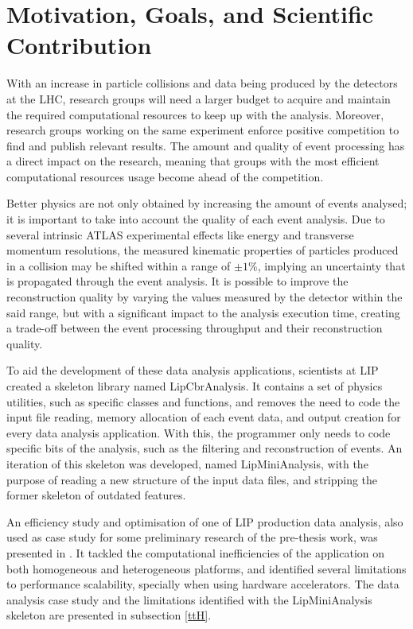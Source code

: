 \section{Motivation, Goals, and Scientific Contribution}
\label{motivation}

With an increase in particle collisions and data being produced by the detectors at the LHC, research groups will need a larger budget to acquire and maintain the required computational resources to keep up with the analysis. Moreover, research groups working on the same experiment enforce positive competition to find and publish relevant results. The amount and quality of event processing has a direct impact on the research, meaning that groups with the most efficient computational resources usage become ahead of the competition.

Better physics are not only obtained by increasing the amount of events analysed; it is important to take into account the quality of each event analysis. Due to several intrinsic ATLAS experimental effects like energy and transverse momentum resolutions, the measured kinematic properties of particles produced in a collision may be shifted within a range of $\pm1\%$, implying an uncertainty that is propagated through the event analysis. It is possible to improve the reconstruction quality by varying the values measured by the detector within the said range, but with a significant impact to the analysis execution time, creating a trade-off between the event processing throughput and their reconstruction quality.

To aid the development of these data analysis applications, scientists at LIP created a skeleton library named LipCbrAnalysis. It contains a set of physics utilities, such as specific classes and functions, and removes the need to code the input file reading, memory allocation of each event data, and output creation for every data analysis application. With this, the programmer only needs to code specific bits of the analysis, such as the filtering and reconstruction of events. An iteration of this skeleton was developed, named LipMiniAnalysis, with the purpose of reading a new structure of the input data files, and stripping the former skeleton of outdated features.

An efficiency study and optimisation of one of LIP production data analysis, also used as case study for some preliminary research of the pre-thesis work, was presented in \cite{Msc:AMP,paperAMP}. It tackled the computational inefficiencies of the application on both homogeneous and heterogeneous platforms, and identified several limitations to performance scalability, specially when using hardware accelerators. The data analysis case study and the limitations identified with the LipMiniAnalysis skeleton are presented in subsection \ref{ttH}.

